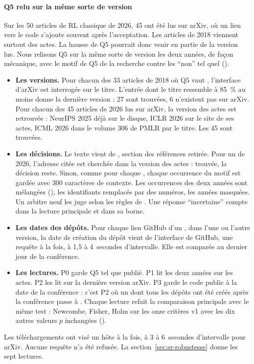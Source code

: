 \paragraph{Q5 relu sur la même sorte de version}\label{sec:sm-versions}
Sur les 50 articles de RL classique de 2026, 45 ont été lus sur arXiv, où un lien vers le code s'ajoute
souvent après l'acceptation. Les articles de 2018 viennent surtout des actes. La hausse de Q5 pourrait
donc venir en partie de la version lue. Nous relisons Q5 sur la même sorte de version les deux
années, de façon mécanique, avec le motif de Q5 de la recherche contre les \enquote{non} tel quel ().
\begin{itemize}
  \item \textbf{Les versions.} Pour chacun des 33 articles de 2018 où Q5 vaut , l'interface
  d'arXiv est interrogée sur le titre. L'entrée dont le titre ressemble à 85~\% au moins donne la
  dernière version : 27 sont trouvées, 6 n'existent pas sur arXiv. Pour chacun des 45 articles de 2026
  lus sur arXiv, la version des actes est retrouvée : NeurIPS 2025 déjà sur le disque, ICLR 2026 sur
  le site de ses actes, ICML 2026 dans le volume 306 de PMLR par le titre. Les 45 sont trouvées.
  \item \textbf{Les décisions.} Le texte vient de , section des références retirée.
  Pour un  de 2026, l'adresse citée est cherchée dans la version des actes : trouvée, la
  décision reste. Sinon, comme pour chaque , chaque occurrence du motif est gardée avec 300
  caractères de contexte. Les occurrences des deux années sont mélangées
  (), les identifiants remplacés par des numéros, les années masquées. Un
  arbitre neuf les juge selon les règles de . Une réponse \enquote{incertaine} compte
   dans la lecture principale et  dans sa borne.
  \item \textbf{Les dates des dépôts.} Pour chaque lien GitHub d'un , dans l'une ou l'autre
  version, la date de création du dépôt vient de l'interface de GitHub, une requête à la fois, à 1,5 à
  4~secondes d'intervalle. Elle est comparée au dernier jour de la conférence.
  \item \textbf{Les lectures.} P0 garde Q5 tel que publié. P1 lit les deux années sur les actes. P2 les
  lit sur la dernière version arXiv. P3 garde le code public à la date de la conférence : c'est P2 où un
   dont tous les dépôts ont été créés après la conférence passe à . Chaque lecture
  refait la comparaison principale avec le même test : Newcombe, Fisher, Holm sur les onze critères v1
  avec les dix autres valeurs $p$ inchangées ().
\end{itemize}
Les téléchargements ont visé un hôte à la fois, à 3 à 6~secondes d'intervalle pour arXiv. Aucune
requête n'a été refusée. La section~\ref{sec:sr-robustesse} donne les sept lectures.
